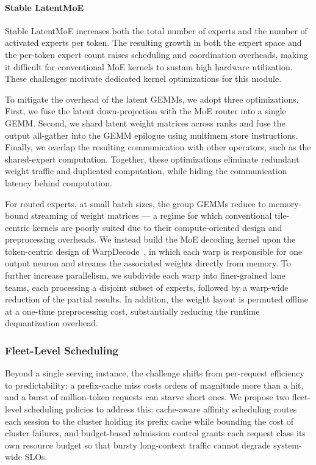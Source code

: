 \paragraph{Stable LatentMoE}

Stable LatentMoE increases both the total number of experts and the number of activated experts per token. The resulting growth in both the expert space and the per-token expert count raises scheduling and coordination overheads, making it difficult for conventional MoE kernels to sustain high hardware utilization. These challenges motivate dedicated kernel optimizations for this module.


To mitigate the overhead of the latent GEMMs, we adopt three optimizations. First, we fuse the latent down-projection with the MoE router into a single GEMM. Second, we shard latent weight matrices across ranks and fuse the output all-gather into the GEMM epilogue using multimem store instructions. Finally, we overlap the resulting communication with other operators, such as the shared-expert computation. Together, these optimizations eliminate redundant weight traffic and duplicated computation, while hiding the communication latency behind computation.


For routed experts, at small batch sizes, the group GEMMs reduce to memory-bound streaming of weight matrices --- a regime for which conventional tile-centric kernels are poorly suited due to their compute-oriented design and preprocessing overheads.
We instead build the MoE decoding kernel upon the token-centric design of WarpDecode~\citep{warpdecode2026}, in which each warp is responsible for one output neuron and streams the associated weights directly from memory. To further increase parallelism, we subdivide each warp into finer-grained lane teams, each processing a disjoint subset of experts, followed by a warp-wide reduction of the partial results. In addition, the weight layout is permuted offline at a one-time preprocessing cost, substantially reducing the runtime dequantization overhead.








\subsubsection{Fleet-Level Scheduling}
Beyond a single serving instance, the challenge shifts from per-request efficiency to predictability: a prefix-cache miss costs orders of magnitude more than a hit, and a burst of million-token requests can starve short ones.
We propose two fleet-level scheduling policies to address this: cache-aware affinity scheduling routes each session to the cluster holding its prefix cache while bounding the cost of cluster failures, and budget-based admission control grants each request class its own resource budget so that bursty long-context traffic cannot degrade system-wide SLOs.


